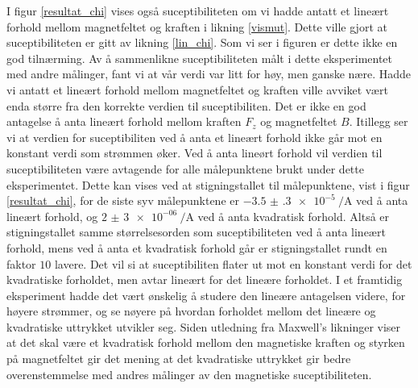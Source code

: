\documentclass[%
 reprint,
 amsmath,amssymb,
 aps,
 norsk,
]{revtex4-1}
\begin{document}
I figur \vref{resultat_chi} vises også suceptibiliteten om vi hadde antatt et lineært forhold mellom magnetfeltet og kraften i likning \eqref{vismut}. Dette ville gjort at suceptibiliteten er gitt av likning \eqref{lin_chi}. Som vi ser i figuren er dette ikke en god tilnærming. Av å sammenlikne suceptibiliteten målt i dette eksperimentet med andre målinger, fant vi at vår verdi var litt for høy, men ganske nære. Hadde vi antatt et lineært forhold mellom magnetfeltet og kraften ville avviket vært enda større fra den korrekte verdien til suceptibiliten. Det er ikke en god antagelse å anta lineært forhold mellom kraften $F_z$ og magnetfeltet $B$. Itillegg ser vi at verdien for suceptibiliten ved å anta et lineært forhold ikke går mot en konstant verdi som strømmen øker. Ved å anta lineørt forhold vil verdien til suceptibiliteten være avtagende for alle målepunktene brukt under dette eksperimentet. Dette kan vises ved at stigningstallet til målepunktene, vist i figur \vref{resultat_chi}, for de siste syv målepunktene er $\SI{-3.5(3)e-5}{\per\ampere}$ ved å anta lineært forhold, og $\SI{2(3)e-06}{\per\ampere}$ ved å anta kvadratisk forhold. Altså er stigningstallet samme størrelsesorden som suceptibiliteten ved å anta lineært forhold, mens ved å anta et kvadratisk forhold går er stigningstallet rundt en faktor $10$ lavere. Det vil si at suceptibiliten flater ut mot en konstant verdi for det kvadratiske forholdet, men avtar lineært for det lineære forholdet.
I et framtidig eksperiment hadde det vært ønskelig å studere den lineære antagelsen videre, for høyere strømmer, og se nøyere på hvordan forholdet mellom det lineære og kvadratiske uttrykket utvikler seg. Siden utledning fra Maxwell's likninger viser at det skal være et kvadratisk forhold mellom den magnetiske kraften og styrken på magnetfeltet gir det mening at det kvadratiske uttrykket gir bedre overenstemmelse med andres målinger av den magnetiske suceptibiliteten.
\par
\end{document}
